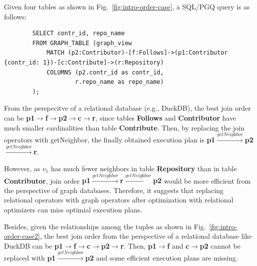\begin{example}
    Given four tables as shown in Fig.~\ref{fig:intro-order-case}, a SQL/PGQ query is as follows:
    \begin{lstlisting}
        SELECT contr_id, repo_name 
        FROM GRAPH_TABLE (graph_view
            MATCH (p2:Contributor)-[f:Follows]->(p1:Contributor {contr_id: 1})-[c:Contribute]->(r:Repository)
            COLUMNS (p2.contr_id as contr_id,
                    r.repo_name as repo_name)
        );
    \end{lstlisting}
    From the perspecitve of a relational database (e.g., DuckDB), the best join order can be \textbf{p1$\rightarrow$f$\rightarrow$p2$\rightarrow$c$\rightarrow$r}, since tables \textbf{Follows} and \textbf{Contributor} have much smaller cardinalities than table \textbf{Contribute}.
    Then, by replacing the join operators with getNeighbor, the finally obtained execution plan is \textbf{p1$\xrightarrow{\textit{getNeighbor}}$p2$\xrightarrow{\textit{getNeighbor}}$r}.

    However, as $v_1$ has much fewer neighbors in table \textbf{Repository} than in table \textbf{Contributor}, join order \textbf{p1$\xrightarrow{\textit{getNeighbor}}$r$\xrightarrow{\textit{getNeighbor}}$p2} would be more efficient from the perspective of graph databases.
    Therefore, it suggests that 
    replacing relational operators with graph operators after optimization with relational optimizers can miss optimial execution plans.

    Besides, given the relationships among the tuples as shown in Fig.~\ref{fig:intro-order-case2}, the best join order from the perspective of a relational database like DuckDB can be \textbf{p1$\rightarrow$f$\rightarrow$c$\rightarrow$p2$\rightarrow$r}.
    Then, \textbf{p1$\rightarrow$f} and \textbf{c$\rightarrow$p2} cannot be replaced with \textbf{p1$\xrightarrow{\textit{getNeighbor}}$p2} and some efficient execution plans are missing.

\end{example}


